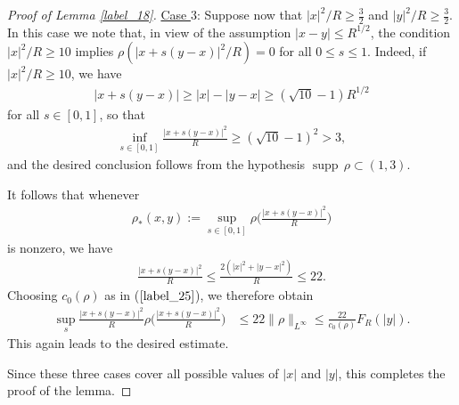 \documentclass[reqno]{amsart}
\numberwithin{equation}{section}
\theoremstyle{remark}
\DeclareMathOperator{\supp}{supp\,}
\begin{document}
\begin{proof}[Proof of Lemma \ref{label_18}]
\noindent \underline{Case $3$}:  Suppose now that $|x|^2/R\geq \frac{3}{2}$ and $|y|^2/R\geq \frac{3}{2}$.  In this case we note that, in view of the assumption $|x-y|\leq R^{1/2}$, the condition $|x|^2/R\geq 10$ implies $\rho(|x+s(y-x)|^2/R)=0$ for all $0\leq s\leq 1$.  Indeed, if $|x|^2/R\geq 10$, we have
\begin{align*}
|x+s(y-x)|\geq |x|-|y-x|\geq (\sqrt{10}-1)R^{1/2}
\end{align*}
for all $s\in [0,1]$, so that
\begin{align*}
\inf_{s\in [0,1]}\frac{|x+s(y-x)|^2}{R}\geq (\sqrt{10}-1)^2>3,
\end{align*}
and the desired conclusion follows from the hypothesis $\supp \rho\subset (1,3)$.

It follows that whenever
\begin{align*}
\rho_*(x,y):=\sup_{s\in [0,1]} \rho\bigg(\frac{|x+s(y-x)|^2}{R}\bigg)
\end{align*}
is nonzero, we have
\begin{align*}
\frac{|x+s(y-x)|^2}{R}\leq \frac{2(|x|^2+|y-x|^2)}{R}\leq 22.
\end{align*}
Choosing $c_0(\rho)$ as in ($\ref{label_25}$), we therefore obtain
\begin{align*}
\sup_s \frac{|x+s(y-x)|^2}{R}\rho\bigg(\frac{|x+s(y-x)|^2}{R}\bigg)&\leq 22\lVert \rho\rVert_{L^\infty}\leq \frac{22}{c_0(\rho)}F_R(|y|).
\end{align*}
This again leads to the desired estimate.

\vspace{0.2in}

Since these three cases cover all possible values of $|x|$ and $|y|$, this completes the proof of the lemma.
\end{proof}
\end{document}
